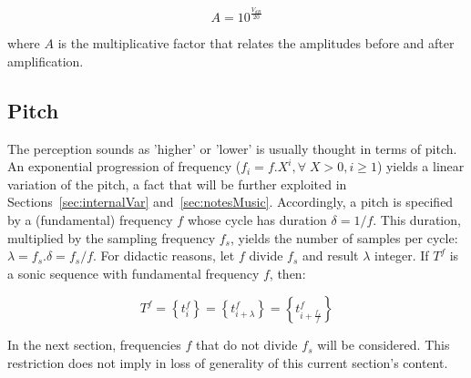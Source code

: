\begin{equation}\label{ampDec}
A = 10^{\frac{V_{dB}}{20}}
\end{equation}

\noindent where $A$ is the multiplicative factor that relates the amplitudes before and after amplification.

\subsection{Pitch}
The perception sounds as 'higher' or 'lower' is usually thought in terms of pitch.
An exponential progression of frequency ($f_i = f . X^i, \forall \;X > 0, i \geq 1$) yields a linear variation of the pitch,
a fact that will be further exploited in Sections~\ref{sec:internalVar} and~\ref{sec:notesMusic}.
Accordingly, a pitch is specified by a (fundamental) frequency $f$ whose cycle has duration $\delta=1/f$.
This duration, multiplied by the sampling frequency $f_s$, yields the number of samples per cycle:
$\lambda=f_s . \delta =f_s/f$.
For didactic reasons, let $f$ divide $f_s$ and result $\lambda$ integer.
If $T^f$ is a sonic sequence with fundamental frequency $f$, then:

\begin{equation}\label{periodicidade}
     T^f=\left\{ t_i^f \right\}=\left\{ t^f_{i+\lambda}  \right\}= \left\{ t^f_{i+\frac{f_s}{f}} \right\}
\end{equation}

In the next section, frequencies $f$ that do not divide $f_s$ will be considered. This restriction does not imply in loss of generality of this current section's content.

